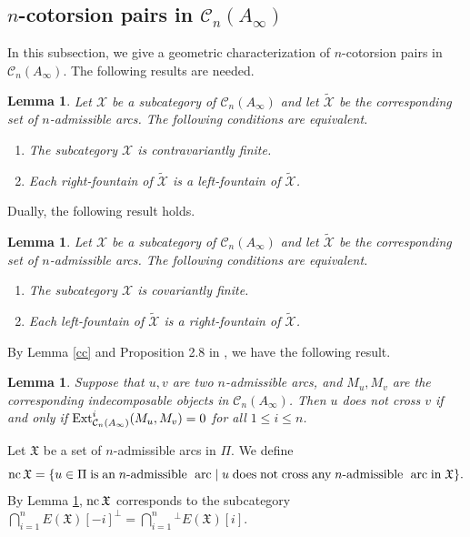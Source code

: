 \documentclass[a4paper,reqno,11pt]{amsart}
\newtheorem{lemma}[theorem]{Lemma}
\theoremstyle{definition}
\def\C{\mathcal{C}}
\def\X{\mathcal{X}}
\def \text{\mbox}
\providecommand{\Ext}{\mathop{\rm Ext}\nolimits}%
\providecommand{\nc}{\mathop{\rm nc}\nolimits}%
\def\XX{\widetilde{\X}}
\begin{document}
\subsection{$n$-cotorsion pairs in $\C_n(A_{\infty})$}
In this subsection, we give a geometric characterization of $n$-cotorsion pairs in $\C_n(A_{\infty})$. The following results are needed.
\begin{lemma}\cite[Proposition 3.4]{HJ1}
\label{aa}
Let $\X$ be a subcategory of $\C_n(A_{\infty})$ and let $\XX$ be the corresponding
set of $n$-admissible arcs.  The following conditions are equivalent.
\begin{enumerate}

  \item[\rm (1)]  The subcategory $\X$ is contravariantly finite.

\smallskip

  \item[\rm (2)]  Each right-fountain of $\XX$ is a left-fountain of $\XX$.

\end{enumerate}
\end{lemma}
Dually, the following result holds.
\begin{lemma}\cite[Proposition 3.5]{HJ1}
\label{bb}
Let $\X$ be a subcategory of $\C_n(A_{\infty})$ and let $\XX$ be the corresponding
set of $n$-admissible arcs.  The following conditions are equivalent.
\begin{enumerate}

  \item[\rm (1)]  The subcategory $\X$ is covariantly finite.

\smallskip

  \item[\rm (2)]  Each left-fountain of $\XX$ is a right-fountain of $\XX$.

\end{enumerate}
\end{lemma}

By Lemma \ref{cc} and Proposition 2.8 in \cite{HJ1}, we have the following result.

\begin{lemma}\label{g}
Suppose that $u, v$ are two $n$-admissible arcs, and $M_u, M_v$ are the corresponding indecomposable objects in $\C_n(A_{\infty})$. Then $u$ does not cross $v$ if and only if  $\Ext^{i}_{\C_n(A_{\infty})}(M_u,M_v)=0$ for all $1\leq i\leq n$.
\end{lemma}
Let  $\mathfrak{X}$ be a set of $n$-admissible arcs in $\Pi$. We define
$$\nc\mathfrak{X}=\{u\in\Pi\text{\;is\;an\;} n\text{-admissible\; arc\;}|\;u \text{\;does\;not\;cross\;any\;} n\text{-admissible\; arc\;in\;}\mathfrak{X}\}.$$
By Lemma \ref{g}, $\nc\mathfrak{X}$ corresponds to the subcategory $\bigcap\limits_{i=1}^{n}E(\mathfrak{X})[-i]^\perp=\bigcap\limits_{i=1}^{n}{^\bot}E(\mathfrak{X})[i]$.
\vspace{2mm}
\end{document}
